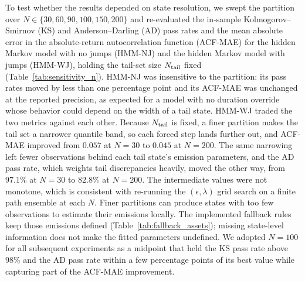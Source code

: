 To test whether the results depended on state resolution, we swept the
partition over $N \in \{30, 60, 90, 100, 150, 200\}$ and
re-evaluated the in-sample Kolmogorov--Smirnov (KS) and
Anderson--Darling (AD) pass rates and the mean absolute error in the
absolute-return autocorrelation function (ACF-MAE) for the hidden
Markov model with no jumps (HMM-NJ) and the hidden Markov model with
jumps (HMM-WJ), holding the tail-set size $N_{\rm tail}$ fixed
(Table~\ref{tab:sensitivity_n}). HMM-NJ was insensitive to the
partition: its pass rates moved by less than one percentage point and
its ACF-MAE was unchanged at the reported precision, as expected for a
model with no duration override whose behavior could depend on the
width of a tail state. HMM-WJ traded the two metrics against each other. Because
$N_{\rm tail}$ is fixed, a finer partition makes the tail set a
narrower quantile band, so each forced step lands further out, and
ACF-MAE improved from $0.057$ at $N = 30$ to $0.045$ at $N = 200$. The
same narrowing left fewer observations behind each tail state's
emission parameters, and the AD pass rate, which weights tail
discrepancies heavily, moved the other way, from $97.1\%$ at $N = 30$
to $82.8\%$ at $N = 200$. The intermediate values were not monotone,
which is consistent with re-running the $(\epsilon, \lambda)$ grid
search on a finite path ensemble at each $N$. Finer partitions can
produce states with too few observations to estimate their emissions
locally. The implemented fallback rules keep those emissions defined
(Table~\ref{tab:fallback_assets}); missing state-level information
does not make the fitted parameters undefined. We adopted $N = 100$ for
all subsequent experiments as a midpoint that held the KS pass rate
above $98\%$ and the AD pass rate within a few percentage points of its
best value while capturing part of the ACF-MAE improvement.

